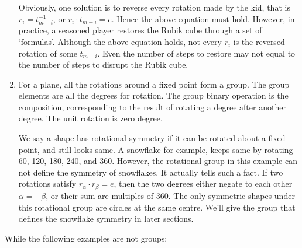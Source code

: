 \documentclass[b5paper]{article}
\begin{document}
\begin{enumerate}
Obviously, one solution is to reverse every rotation made by the kid, that is $r_i = t_{m-i}^{-1}$, or $r_i \cdot t_{m-i} = e$. Hence the above equation must hold. However, in practice, a seasoned player restores the Rubik cube through a set of `formulas'. Although the above equation holds, not every $r_i$ is the reversed rotation of some $t_{m-i}$. Even the number of steps to restore may not equal to the number of steps to disrupt the Rubik cube.

\item For a plane, all the rotations around a fixed point form a group. The group elements are all the degrees for rotation. The group binary operation is the composition, corresponding to the result of rotating a degree after another degree. The unit rotation is zero degree.

We say a shape has rotational symmetry if it can be rotated about a fixed point, and still looks same. A snowflake for example, keeps same by rotating 60\degree, 120\degree, 180\degree, 240\degree, and 360\degree. However, the rotational group in this example can not define the symmetry of snowflakes. It actually tells such a fact. If two rotations satisfy $r_{\alpha} \cdot r_{\beta} = e$, then the two degrees either negate to each other $\alpha = -\beta$, or their sum are multiples of 360\degree. The only symmetric shapes under this rotational group are circles at the same centre. We'll give the group that defines the snowflake symmetry in later sections.

\end{enumerate}

While the following examples are not groups:
\end{document}
